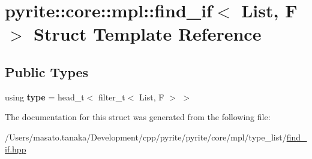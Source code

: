 \hypertarget{structpyrite_1_1core_1_1mpl_1_1find__if}{}\section{pyrite\+:\+:core\+:\+:mpl\+:\+:find\+\_\+if$<$ List, F $>$ Struct Template Reference}
\label{structpyrite_1_1core_1_1mpl_1_1find__if}
\subsection*{Public Types}
\begin{DoxyCompactItemize}
\item 
\mbox{\label{structpyrite_1_1core_1_1mpl_1_1find__if_ae1373592277cc645482016f822963d12}} 
using {\bfseries type} = head\+\_\+t$<$ filter\+\_\+t$<$ List, F $>$ $>$
\end{DoxyCompactItemize}


The documentation for this struct was generated from the following file\+:\begin{DoxyCompactItemize}
\item 
/\+Users/masato.\+tanaka/\+Development/cpp/pyrite/pyrite/core/mpl/type\+\_\+list/\mbox{\hyperlink{core_2mpl_2type__list_2find__if_8hpp}{find\+\_\+if.\+hpp}}\end{DoxyCompactItemize}
